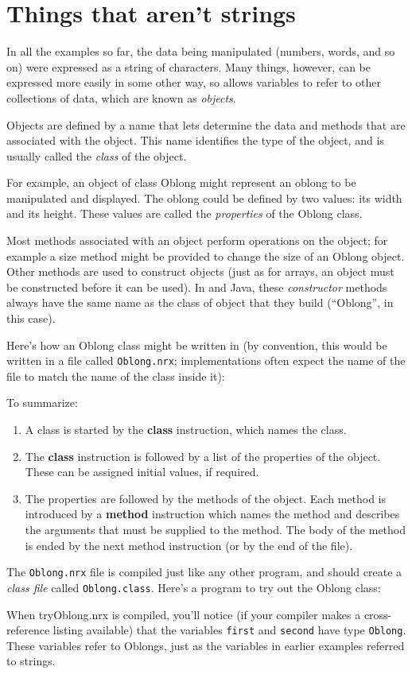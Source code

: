 \section{Things that aren’t strings}
In all the examples so far, the data being manipulated (numbers, words, and so on) were expressed as a string of characters. Many things, however, can be expressed more easily in some other way, so \nr{} allows variables to refer to other collections of data, which are known as \emph{objects}.

Objects are defined by a name that lets \nr{} determine the data and methods that are associated with the object. This name identifies the type of the object, and is usually called the \emph{class} of the object.

For example, an object of class Oblong might represent an oblong to be manipulated and displayed. The oblong could be defined by two values: its width and its height. These values are called the \emph{properties} of the Oblong class.

Most methods associated with an object perform operations on the object; for example a size method might be provided to change the size of an Oblong object. Other methods are used to construct objects (just as for arrays, an object must be constructed before it can be used). In \nr{} and Java, these \emph{constructor} methods always have the same name as the class of object that they build (“Oblong”, in this case).

Here’s how an Oblong class might be written in \nr{} (by convention,
this would be written in a file called \texttt{Oblong.nrx}; implementations
often expect the name of the file to match the name of the class
inside it):

To summarize:
\begin{enumerate}
\item A class is started by the \textbf{class} instruction, which names the class.
\item The \textbf{class} instruction is followed by a list of the properties of the object. These can be assigned initial values, if required.
\item The properties are followed by the methods of the object. Each
method is introduced by a \textbf{method} instruction which names the method
and describes the arguments that must be supplied to the method. The
body of the method is ended by the next method instruction (or by the
end of the file).
\end{enumerate}
The \texttt{Oblong.nrx} file is compiled just like any other \nr{} program,
and should create a \emph{class file} called \texttt{Oblong.class}. Here’s a program
to try out the Oblong class:

When tryOblong.nrx is compiled, you’ll notice (if your compiler makes a cross-reference listing available) that the variables \texttt{first} and \texttt{second} have type \texttt{Oblong}. These variables refer to Oblongs, just as the variables in earlier examples referred to \nr{} strings.

